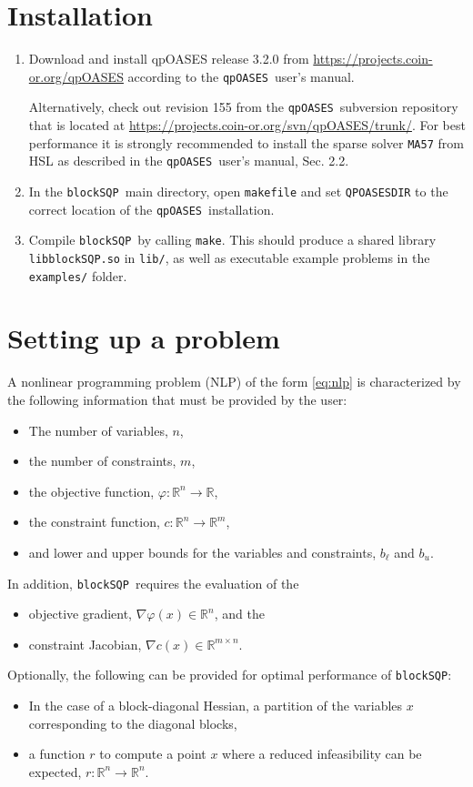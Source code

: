 \documentclass[	11pt,
				a4paper,
				abstract=true,
				twoside=true,
				bibliography=totoc, 
				headinclude=true,
				footinclude=false]{scrartcl}
\newcommand{\R}{\mathbb{R}}				%
\newcommand{\qpOASES}{\texttt{qpOASES}}
\newcommand{\blockSQP}{\texttt{blockSQP}}
\newcommand{\heu}{r}
\begin{document}
\section{Installation}
\begin{enumerate}
\item Download and install qpOASES release 3.2.0 from \url{https://projects.coin-or.org/qpOASES} according to the \qpOASES\ user's manual.

	Alternatively, check out revision 155 from the \qpOASES\ subversion repository that is located at \url{https://projects.coin-or.org/svn/qpOASES/trunk/}. For best performance it is strongly recommended to install the sparse solver \texttt{MA57} from HSL as described in the \qpOASES\ user's manual, Sec. 2.2.
\item In the \blockSQP\ main directory, open \texttt{makefile} and set \texttt{QPOASESDIR} to the correct location of the \qpOASES\ installation.
\item Compile \blockSQP\ by calling \texttt{make}. This should produce a shared library \texttt{libblockSQP.so} in  \texttt{lib/}, as well as executable example problems in the \texttt{examples/} folder.
\end{enumerate}


\section{Setting up a problem}
A nonlinear programming problem (NLP) of the form \eqref{eq:nlp} is characterized by the following information that must be provided by the user:
\begin{itemize}
\item The number of variables, $n$,
\item the number of constraints, $m$,
\item the objective function, $\varphi:\R^{n}\longrightarrow\R$,
\item the constraint function, $c:\R^{n}\longrightarrow\R^{m}$,
\item and lower and upper bounds for the variables and constraints, $b_{\ell}$ and $b_{u}$.
\end{itemize}
In addition, \blockSQP\ requires the evaluation of the
\begin{itemize}
\item objective gradient, $\nabla \varphi(x)\in\R^{n}$, and the
\item constraint Jacobian, $\nabla c(x)\in\R^{m\times n}$.
\end{itemize}
Optionally, the following can be provided for optimal performance of \blockSQP:
\begin{itemize}
\item In the case of a block-diagonal Hessian, a partition of the variables $x$ corresponding to the diagonal blocks,
\item a function $r$ to compute a point $x$ where a reduced infeasibility can be expected, $\heu:\R^{n}\longrightarrow\R^{n}$.
\end{itemize}
\end{document}
